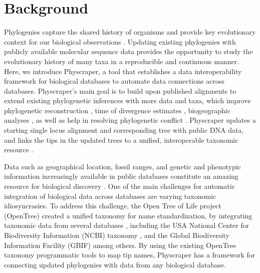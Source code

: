 \documentclass{bmcart}
\begin{document}

\section*{Background}
Phylogenies capture the shared history of organisms and provide key evolutionary
context for our biological observations \cite{dobzhansky1973nothing}.
Updating existing phylogenies with publicly available molecular sequence data provides
the opportunity to study
the evolutionary history of many taxa in a reproducible and continuous manner.
Here, we introduce Physcraper, a tool that establishes a data interoperability
framework for biological databases to automate data connections across databases.
Physcraper's main goal is to build upon published alignments to extend existing
phylogenetic inferences with more data and taxa, which improve
phylogenetic reconstruction \cite{hillis1996inferring, natsidis2019phylogenomics},
time of divergence estimates \cite{schulte2013undersampling, soares2015influence},
biogeographic analyses \cite{kayaalp2017back},
as well as help in resolving phylogenetic conflict \cite{hedtke2006resolution, townsend2010optimal, natsidis2019phylogenomics}.
Physcraper updates a starting single locus alignment and corresponding tree
with public DNA data, and links the tips in the updated trees to a unified, interoperable
taxonomic resource \cite{rees2017automated}.

Data such as
geographical location, fossil ranges, and genetic and phenotypic information increasingly
available in public databases constitute an amazing
resource for biological discovery \cite{baxevanis2015importance}.
One of the main challenges for automatic
integration of biological data across databases are varying taxonomic idiosyncrasies.
To address this challenge, the Open Tree of Life project (OpenTree)
created a unified taxonomy for name standardization, by integrating taxonomic
data from several databases \cite{rees2017automated}, including the USA National
Center for Biodiversity Information (NCBI) taxonomy \cite{federhen_ncbi_2012, schoch_ncbi_2020},
and the Global Biodiversity Information Facility (GBIF) \cite{gbif_secretariat_gbif_2019} among others.
By using the existing OpenTree taxonomy programmatic tools to map tip names,
Physcraper has a framework for connecting updated phylogenies with data from any
biological database.
\end{document}
